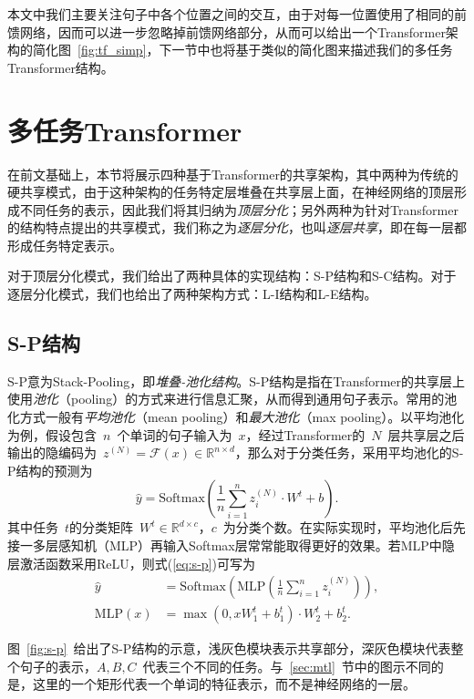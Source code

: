 本文中我们主要关注句子中各个位置之间的交互，由于对每一位置使用了相同的前馈网络，因而可以进一步忽略掉前馈网络部分，从而可以给出一个Transformer架构的简化图~\ref{fig:tf_simp}，下一节中也将基于类似的简化图来描述我们的多任务Transformer结构。

\section{多任务Transformer}
\label{sec:mtl_tf}
在前文基础上，本节将展示四种基于Transformer的共享架构，其中两种为传统的硬共享模式，由于这种架构的任务特定层堆叠在共享层上面，在神经网络的顶层形成不同任务的表示，因此我们将其归纳为\emph{顶层分化}；另外两种为针对Transformer的结构特点提出的共享模式，我们称之为\emph{逐层分化}，也叫\emph{逐层共享}，即在每一层都形成任务特定表示。

对于顶层分化模式，我们给出了两种具体的实现结构：S-P结构和S-C结构。对于逐层分化模式，我们也给出了两种架构方式：L-I结构和L-E结构。

\subsection{S-P结构}
S-P意为Stack-Pooling，即\emph{堆叠-池化结构}。S-P结构是指在Transformer的共享层上使用\emph{池化}（pooling）的方式来进行信息汇聚，从而得到通用句子表示。常用的池化方式一般有\emph{平均池化}（mean pooling）和\emph{最大池化}（max pooling）。以平均池化为例，假设包含~$n$~个单词的句子输入为~$x$，经过Transformer的~$N$~层共享层之后输出的隐编码为~$z^{(N)} = \mathcal{F}(x) \in \mathbb{R}^{n \times d}$，那么对于分类任务，采用平均池化的S-P结构的预测为
\begin{equation}
	\hat{y} = \mathrm{Softmax}(\frac{1}{n}\sum_{i=1}^{n}z^{(N)}_i\cdot W^{t} + b).
	\label{eq:s-p}
\end{equation}
其中任务~$t$的分类矩阵~$W^{t}\in \mathbb{R}^{d\times c}$，$c$~为分类个数。在实际实现时，平均池化后先接一多层感知机（MLP）再输入Softmax层常常能取得更好的效果。若MLP中隐层激活函数采用ReLU，则式(\ref{eq:s-p})可写为
\begin{align}
	\hat{y} &= \mathrm{Softmax}(\mathrm{MLP}(\frac{1}{n}\sum_{i=1}^{n}z^{(N)}_i)),\\
	\mathrm{MLP}(x) &= \max(0, xW^t_1 + b^t_1)\cdot W^t_2 +b^t_2.
\end{align}

图~\ref{fig:s-p}~给出了S-P结构的示意，浅灰色模块表示共享部分，深灰色模块代表整个句子的表示，$A,B,C$~代表三个不同的任务。与~\ref{sec:mtl}~节中的图示不同的是，这里的一个矩形代表一个单词的特征表示，而不是神经网络的一层。

